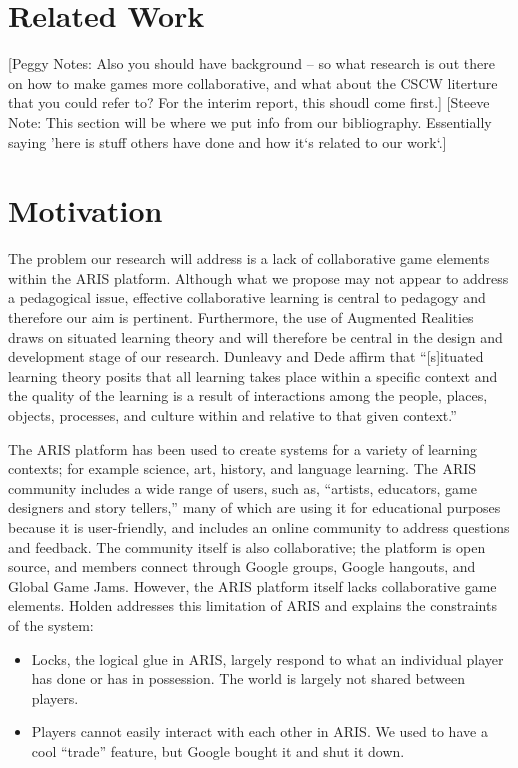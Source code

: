 \documentclass{sigchi}
\begin{document}
\section{Related Work}
[Peggy Notes:
Also you should have background -- so what research is out there on how to make games more collaborative, and what about the CSCW literture that you could refer to?  For the interim report, this shoudl come first.]
[Steeve Note: This section will be where we put info from our bibliography. Essentially saying 'here is stuff others have done and how it`s related to our work`.]

\section{Motivation}
The problem our research will address is a lack of collaborative game elements within the ARIS platform.  Although what we propose may not appear to address a pedagogical issue, effective collaborative learning is central to pedagogy and therefore our aim is pertinent.\cite{inaba2004learners} Furthermore, the use of Augmented Realities draws on situated learning theory and will therefore be central in the design and development stage of our research. Dunleavy and Dede affirm that ``[s]ituated learning theory posits that all learning takes place within a specific context and the quality of the learning is a result of interactions among the people, places, objects, processes, and culture within and relative to that given context.''\cite{dunleavy2014augmented}

The ARIS platform has been used to create systems for a variety of learning contexts; for example science, art, history, and language learning.\cite{gagnon2010aris, holden2012leveraging, roy2013examining, dunleavy2014augmented} The ARIS community includes a wide range of users, such as, ``artists, educators, game designers and story tellers,''\cite{aris2015} many of which are using it for educational purposes because it is user-friendly, and includes an online community to address questions and feedback.\cite{roy2013examining} The community itself is also collaborative; the platform is open source, and members connect through Google groups, Google hangouts, and Global Game Jams. However, the ARIS platform itself lacks collaborative game elements. Holden addresses this limitation of ARIS and explains the constraints of the system:

\begin{itemize}
  \item Locks, the logical glue in ARIS, largely respond to what an individual player has done or has in possession. The world is largely not shared between players.
  \item Players cannot easily interact with each other in ARIS. We used to have a cool ``trade'' feature, but Google bought it and shut it down.\cite{algorar2015}
\end{itemize}
\end{document}
